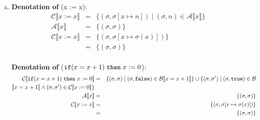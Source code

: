 \documentclass[10pt, oneside]{article}
\begin{document}
\begin{enumerate}[1.]
\begin{enumerate} [(a)]
\begin{eqnarray*}
        P(n+1): & & f_{n+1} = F(f_n) \\
                & = & \{(\sigma, \sigma'') 
    					    \mid (\sigma, \sigma') \in \mathcal{C} \llbracket c \rrbracket 
                \wedge (\sigma', \sigma'') \in f_n \}
      \end{eqnarray*}
      Using our inductive hypothesis, we can conclude that $f_n = \emptyset$ which
      in turn means that the second rule in the set comprehension (e.g. $(\sigma',
      \sigma'') \in f_n$) is unsatisfiable. So the right hand side of the equation
      is just the empty set, as desired:
      
      $$f_{n+1} = \emptyset \text{ } \checkmark$$ 
      
      Therefore, $P(n)$ hold for all $n \in \mathbb{N}$ and the fixed point of $F'$ 
      is:
      
      $$ \text{fix}(F') = \bigcup_{i \geq 0} F'^{i}(\emptyset) = \emptyset \cup 
      \emptyset \cup ... \cup \emptyset = \emptyset$$

      In short, $c_b$ is guaranteed not to terminate, just like $c_a$.
      
    \item {\bf Denotation of}  (x := x):
       \begin{eqnarray*}  \mathcal{C} \llbracket x := x \rrbracket & = & \{ (\sigma, \sigma[x \mapsto n]) \mid (\sigma, n) \in \mathcal{A} \llbracket x \rrbracket \} \\
    \mathcal{A} \llbracket x \rrbracket & = & \{ (\sigma, \sigma)\} \\
     \mathcal{C} \llbracket x := x \rrbracket & = & \{ (\sigma, \sigma[x \mapsto \sigma(x)]) \}\\
     & = & \{(\sigma, \sigma)\}\\
   \end{eqnarray*}
   
   
   {\bf Denotation of}   ($\texttt{if} (x = x+1) \hspace{1mm} \texttt{then} \hspace{1mm} x := 0$):
       \begin{eqnarray*}  \mathcal{C} \llbracket \texttt{if} (x = x+1) \hspace{1mm} \texttt{then}\hspace{1mm} x := 0 \rrbracket & = & \{ (\sigma, \sigma) \mid (\sigma, \texttt{false}) \in \mathcal{B} \llbracket x = x + 1 \rrbracket \} \cup \{ (\sigma, \sigma') \mid (\sigma, \texttt{true}) \in \mathcal{B}\\  \llbracket x = x + 1 \rrbracket \wedge (\sigma, \sigma') \in \mathcal{C}\llbracket x := 0 \rrbracket \} \\
    \mathcal{A} \llbracket x \rrbracket & = & \{ (\sigma, \sigma)\} \\
     \mathcal{C} \llbracket x := x \rrbracket & = & \{ (\sigma, \sigma[x \mapsto \sigma(x)]) \}\\
     & = & \{(\sigma, \sigma)\}\\
   \end{eqnarray*}


\end{enumerate}
\end{enumerate}
\end{document}

